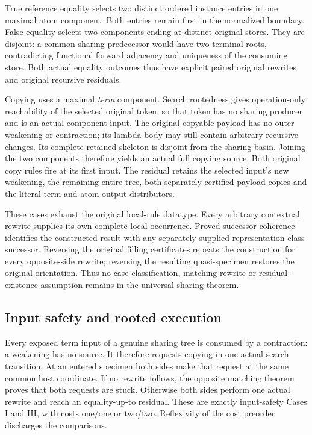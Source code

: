 True reference equality selects two distinct ordered instance entries in
one maximal atom component. Both entries remain first in the normalized
boundary. False equality selects two components ending at distinct original
stores. They are disjoint: a common sharing predecessor would have two
terminal roots, contradicting functional forward adjacency and uniqueness
of the consuming store. Both actual equality outcomes thus have explicit
paired original rewrites and original recursive residuals.

Copying uses a maximal \emph{term} component. Search rootedness gives
operation-only reachability of the selected original token, so that token
has no sharing producer and is an actual component input. The original
copyable payload has no outer weakening or contraction; its lambda body
may still contain arbitrary recursive changes. Its complete retained
skeleton is disjoint from the sharing basin. Joining the two components
therefore yields an actual full copying source. Both original copy rules
fire at its first input. The residual retains the selected input's new
weakening, the remaining entire tree, both separately certified payload
copies and the literal term and atom output distributors.

These cases exhaust the original local-rule datatype. Every arbitrary
contextual rewrite supplies its own complete local occurrence. Proved
successor coherence identifies the constructed result with any separately
supplied representation-class successor. Reversing the original filling
certificates repeats the construction for every opposite-side rewrite;
reversing the resulting quasi-specimen restores the original orientation.
Thus no case classification, matching rewrite or residual-existence
assumption remains in the universal sharing theorem.

\subsection{Input safety and rooted execution}
Every exposed term input of a genuine sharing tree is consumed by a
contraction: a weakening has no source. It therefore requests copying in
one actual search transition. At an entered specimen both sides make that
request at the same common host coordinate. If no rewrite follows, the
opposite matching theorem proves that both requests are stuck. Otherwise
both sides perform one actual rewrite and reach an equality-up-to residual.
These are exactly input-safety Cases I and III, with costs one/one or
two/two. Reflexivity of the cost preorder discharges the comparisons.

